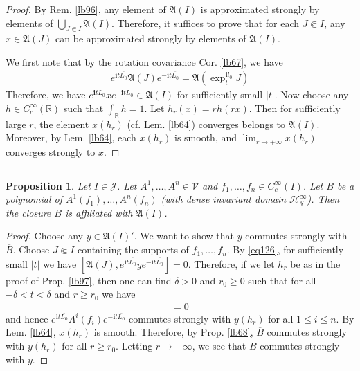 \documentclass[12pt,b5paper,notitlepage]{article}
\theoremstyle{definition}
\theoremstyle{plain}
\newtheorem{pp}[df]{Proposition}
\newcommand{\fk}{\mathfrak}
\newcommand{\mc}{\mathcal}
\newcommand{\ovl}{\overline}
\newcommand{\im}{\mathbf{i}}
\newcommand{\Rbb}{\mathbb R}
\newcommand{\HV}{\mathcal H_{\mathbb V}}
\numberwithin{equation}{section}
\begin{document}
\begin{proof}
By Rem. \ref{lb96}, any element of $\fk A(I)$ is approximated strongly by elements of $\bigcup_{J\Subset I}\fk A(I)$. Therefore, it suffices to prove that for each $J\Subset I$, any $x\in\fk A(J)$ can be approximated strongly by elements of $\fk A(I)$. 


We first note that by the rotation covariance Cor. \ref{lb67}, we have
\begin{align}\label{eq126}
e^{\im t\ovl{L_0}}\fk A(J)e^{-\im t\ovl{L_0}}=\fk A(\exp^{\im l_0}_tJ)
\end{align}
Therefore, we have $e^{\im t\ovl{L_0}}xe^{-\im t\ovl{L_0}}\in\fk A(I)$ for sufficiently small $|t|$. Now choose any $h\in C_c^\infty(\Rbb)$ such that $\int_\Rbb h=1$. Let $h_r(x)=rh(rx)$. Then for sufficiently large $r$, the element $x(h_r)$ (cf. Lem. \ref{lb64}) converges belongs to $\fk A(I)$. Moreover, by Lem. \ref{lb64}, each $x(h_r)$ is smooth, and $\lim_{r\rightarrow+\infty} x(h_r)$ converges strongly to $x$.
\end{proof}




\subsection{}




\begin{pp}\label{lb98}
Let $I\in\mc J$. Let $A^1,\dots,A^n\in\mc V$ and $f_1,\dots,f_n\in C_c^\infty(I)$. Let $B$ be a polynomial of $A^1(f_1),\dots,A^n(f_n)$ (with dense invariant domain $\HV^\infty$). Then the closure $\ovl B$ is affiliated with $\fk A(I)$.
\end{pp}


\begin{proof}
Choose any $y\in \fk A(I)'$. We want to show that $y$ commutes strongly with $\ovl B$. Choose $J\Subset I$ containing the supports of $f_1,\dots,f_n$. By \eqref{eq126}, for sufficiently small $|t|$ we have $[\fk A(J),e^{\im t\ovl{L_0}}ye^{-\im t\ovl{L_0}}]=0$. Therefore, if we let $h_r$ be as in the proof of Prop. \ref{lb97}, then one can find $\delta>0$ and $r_0\geq0$ such that for all $-\delta<t<\delta$ and $r\geq r_0$ we have
\begin{align*}
[e^{\im t\ovl{L_0}}\fk A(J)e^{-\im t\ovl{L_0}},y(h_r)]=0
\end{align*}
and hence $e^{\im t\ovl{L_0}}A^i(f_i)e^{-\im t\ovl{L_0}}$ commutes strongly with $y(h_r)$ for all $1\leq i\leq n$. By Lem. \ref{lb64}, $x(h_r)$ is smooth. Therefore, by Prop. \ref{lb68}, $\ovl B$ commutes strongly with $y(h_r)$ for all $r\geq r_0$. Letting $r\rightarrow+\infty$, we see that $\ovl B$ commutes strongly with $y$.
\end{proof}
\end{document}
